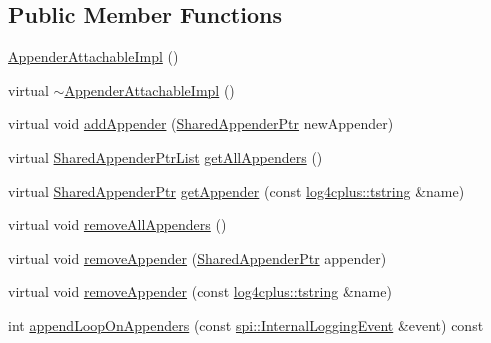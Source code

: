 \subsection*{Public Member Functions}
\begin{DoxyCompactItemize}
\item 
\hyperlink{classlog4cplus_1_1helpers_1_1AppenderAttachableImpl_a75e72937f38f10ed4b6ad3037693d9a6}{Appender\-Attachable\-Impl} ()
\item 
virtual \hyperlink{classlog4cplus_1_1helpers_1_1AppenderAttachableImpl_a981afb52bb47bba095f98b7f7d7637db}{$\sim$\-Appender\-Attachable\-Impl} ()
\item 
virtual void \hyperlink{classlog4cplus_1_1helpers_1_1AppenderAttachableImpl_aca76897f6b871f4448c13e98aac91686}{add\-Appender} (\hyperlink{namespacelog4cplus_a12d841b842c72396be9219ce67a0c215}{Shared\-Appender\-Ptr} new\-Appender)
\item 
virtual \hyperlink{namespacelog4cplus_a97158ac12736f649c5477d7b63f51ede}{Shared\-Appender\-Ptr\-List} \hyperlink{classlog4cplus_1_1helpers_1_1AppenderAttachableImpl_adba6d99104f76364e2d1f17d9f3943d4}{get\-All\-Appenders} ()
\item 
virtual \hyperlink{namespacelog4cplus_a12d841b842c72396be9219ce67a0c215}{Shared\-Appender\-Ptr} \hyperlink{classlog4cplus_1_1helpers_1_1AppenderAttachableImpl_a7ee477506dc4fee9a36082e6bdde9d0b}{get\-Appender} (const \hyperlink{namespacelog4cplus_a3c9287f6ebcddc50355e29d71152117b}{log4cplus\-::tstring} \&name)
\item 
virtual void \hyperlink{classlog4cplus_1_1helpers_1_1AppenderAttachableImpl_a133237ac8ca067697ae1d94002fefe69}{remove\-All\-Appenders} ()
\item 
virtual void \hyperlink{classlog4cplus_1_1helpers_1_1AppenderAttachableImpl_ae86f241f0d1461cc30bdc80192ee30df}{remove\-Appender} (\hyperlink{namespacelog4cplus_a12d841b842c72396be9219ce67a0c215}{Shared\-Appender\-Ptr} appender)
\item 
virtual void \hyperlink{classlog4cplus_1_1helpers_1_1AppenderAttachableImpl_a39e6194102393053927e040a4826a5b0}{remove\-Appender} (const \hyperlink{namespacelog4cplus_a3c9287f6ebcddc50355e29d71152117b}{log4cplus\-::tstring} \&name)
\item 
int \hyperlink{classlog4cplus_1_1helpers_1_1AppenderAttachableImpl_aef27cce9f999ce3213cb778339cb53c1}{append\-Loop\-On\-Appenders} (const \hyperlink{classlog4cplus_1_1spi_1_1InternalLoggingEvent}{spi\-::\-Internal\-Logging\-Event} \&event) const 
\end{DoxyCompactItemize}
